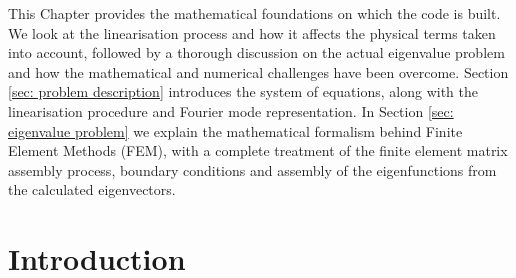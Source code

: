 This Chapter provides the mathematical foundations on which the {\legolas} code is built. We look at the linearisation process and how it affects the physical terms taken into account, followed by a thorough discussion on the actual eigenvalue problem and how the mathematical and numerical challenges have been overcome.
Section \ref{sec: problem description} introduces the system of equations, along with the linearisation procedure and Fourier mode representation. In Section \ref{sec: eigenvalue problem} we explain the mathematical formalism behind Finite Element Methods (FEM), with a complete treatment of the finite element matrix assembly process, boundary conditions and assembly of the eigenfunctions from the calculated eigenvectors.

\section{Introduction}
